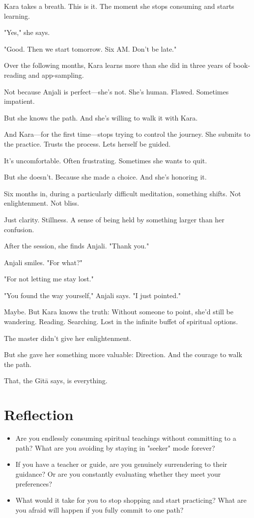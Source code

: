 \documentclass[11pt,twoside]{book}
\begin{document}
Kara takes a breath. This is it. The moment she stops consuming and starts learning.

"Yes," she says.

"Good. Then we start tomorrow. Six AM. Don't be late."

Over the following months, Kara learns more than she did in three years of book-reading and app-sampling.

Not because Anjali is perfect—she's not. She's human. Flawed. Sometimes impatient.

But she knows the path. And she's willing to walk it with Kara.

And Kara—for the first time—stops trying to control the journey. She submits to the practice. Trusts the process. Lets herself be guided.

It's uncomfortable. Often frustrating. Sometimes she wants to quit.

But she doesn't. Because she made a choice. And she's honoring it.

Six months in, during a particularly difficult meditation, something shifts. Not enlightenment. Not bliss.

Just clarity. Stillness. A sense of being held by something larger than her confusion.

After the session, she finds Anjali. "Thank you."

Anjali smiles. "For what?"

"For not letting me stay lost."

"You found the way yourself," Anjali says. "I just pointed."

Maybe. But Kara knows the truth: Without someone to point, she'd still be wandering. Reading. Searching. Lost in the infinite buffet of spiritual options.

The master didn't give her enlightenment.

But she gave her something more valuable: Direction. And the courage to walk the path.

That, the Gītā says, is everything.

\section*{Reflection}

\begin{itemize}
\item Are you endlessly consuming spiritual teachings without committing to a path? What are you avoiding by staying in "seeker" mode forever?
\item If you have a teacher or guide, are you genuinely surrendering to their guidance? Or are you constantly evaluating whether they meet your preferences?
\item What would it take for you to stop shopping and start practicing? What are you afraid will happen if you fully commit to one path?
\end{itemize}
\end{document}

